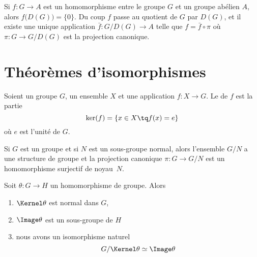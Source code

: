 Si \( f\colon G\to A\) est un homomorphisme entre le groupe \( G\) et un groupe abélien \( A\), alors \( f\big( D(G) \big)=\{ 0 \}\). Du coup \( f\) passe au quotient de \( G\) par \( D(G)\), et il existe une unique application \( \bar f\colon G/D(G)\to A\) telle que \( f=\bar f\circ \pi\) où \( \pi\colon G\to G/D(G)\) est la projection canonique.

\section{Théorèmes d'isomorphismes}

\begin{definition}      \label{DEFooWBIYooGNRYOp}
    Soient un groupe \( G\), un ensemble $X$ et une application \( f\colon X\to G\). Le  de \( f\) est la partie
    \begin{equation}
        \ker(f)=\{ x\in X\tq f(x)=e \}
    \end{equation}
    où \( e\) est l'unité de \( G\).
\end{definition}

Si \( G\) est un groupe et si \( N\) est un sous-groupe normal, alors l'ensemble \( G/N\) a une structure de groupe et la projection canonique \( \pi\colon G\to G/N\) est un homomorphisme surjectif de noyau~\( N\).

\begin{theorem}        \label{ThoPremierthoisomo}
    Soit \( \theta\colon G\to H\) un homomorphisme de groupe. Alors
    \begin{enumerate}
        \item
            \( \Kernel\theta\) est normal dans \( G\),
        \item
            \( \Image \theta\) est un sous-groupe de \( H\)
        \item   \label{ItemWLCLdk}
            nous avons un isomorphisme naturel
            \begin{equation}
                G/\Kernel\theta\simeq \Image\theta
            \end{equation}
    \end{enumerate}
\end{theorem}

